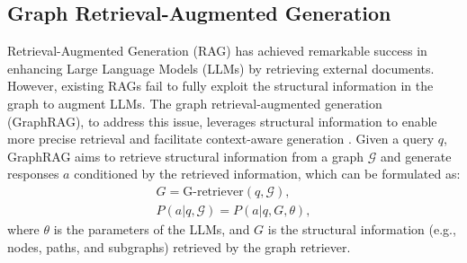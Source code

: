 
\subsection{Graph Retrieval-Augmented Generation}
Retrieval-Augmented Generation (RAG) has achieved remarkable success in enhancing Large Language Models (LLMs) by retrieving external documents. However, existing RAGs fail to fully exploit the structural information in the graph to augment LLMs. The graph retrieval-augmented generation (GraphRAG), to address this issue, leverages structural information to enable more precise retrieval and facilitate context-aware generation \cite{peng2024graph}. Given a query $q$, GraphRAG aims to retrieve structural information from a graph $\mathcal{G}$ and generate responses $a$ conditioned by the retrieved information, which can be formulated as:
\begin{gather}
    G = \text{G-retriever}(q, \mathcal{G}), \\
    P(a|q,\mathcal{G}) = P(a|q,G,\theta),
\end{gather}   
where $\theta$ is the parameters of the LLMs, and $G$ is the structural information (e.g., nodes, paths, and subgraphs) retrieved by the graph retriever. 



